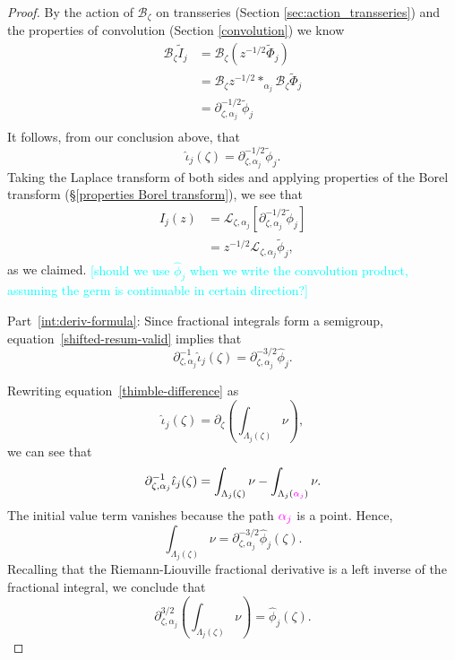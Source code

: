 \documentclass{article}
\theoremstyle{definition}
\newcommand{\C}{\mathbb{C}}
\newcommand{\fracderiv}[3]{\partial^{#1}_{#2, #3}}
\newcommand{\laplace}{\mathcal{L}}
\newcommand{\borel}{\mathcal{B}}
\begin{document}
\begin{proof}
By the action of $\borel_\zeta$ on transseries (Section \ref{sec:action_transseries}) and the properties of convolution (Section \ref{convolution}) we know 
\begin{align*}
\borel_{\zeta} \tilde{I}_j & = \borel_{\zeta}( z^{-1/2} \tilde{\Phi}_j) \\
&=\borel_\zeta z^{-1/2}\ast_{\alpha_j}\borel_\zeta\tilde{\Phi}_j\\
& = \fracderiv{-1/2}{\zeta}{\alpha_j}  \tilde{\phi}_j \\
\end{align*}
It follows, from our conclusion above, that
\begin{equation}\label{shifted-resum-valid}
\hat{\iota}_j(\zeta) = \fracderiv{-1/2}{\zeta}{\alpha_j} \tilde{\phi}_j.
\end{equation}
Taking the Laplace transform of both sides and applying properties of the Borel transform (\S \ref{properties Borel transform}), we see that
\begin{align*}
I_j(z) & = \laplace_{\zeta, \alpha_j} \left[ \partial^{-1/2}_{\zeta, \alpha_j}  \tilde{\phi}_j \right] \\
& = z^{-1/2} \laplace_{\zeta, \alpha_j} \tilde{\phi}_j,
\end{align*}
as we claimed. \textcolor{cyan}{[should we use $\hat{\phi}_j$ when we write the convolution product, assuming the germ is continuable in certain direction?]}

Part~\eqref{int:deriv-formula}: Since fractional integrals form a semigroup, equation~\eqref{shifted-resum-valid} implies that
\[ \fracderiv{-1}{\zeta}{\alpha_j} \hat{\iota}_j(\zeta) = \fracderiv{-3/2}{\zeta}{\alpha_j} \hat{\phi}_j. \]

Rewriting equation~\eqref{thimble-difference} as
\[ \hat{\iota}_j(\zeta) = \partial_\zeta \left( \int_{\Lambda_j(\zeta)} \nu \right), \]
we can see that
\[ \fracderiv{-1}{\zeta}{\alpha_j} \hat{\iota}_j(\zeta) = \int_{\Lambda_j(\zeta)} \nu - \int_{\Lambda_j(\textcolor{Magenta}{\alpha_j})} \nu. \]
The initial value term vanishes because the path $\textcolor{Magenta}{\alpha_j}$ is a point. Hence,
\[ \int_{\Lambda_j(\zeta)} \nu = \fracderiv{-3/2}{\zeta}{\alpha_j} \hat{\phi}_j(\zeta). \]
Recalling that the Riemann-Liouville fractional derivative is a left inverse of the fractional integral, we conclude that
\[ \fracderiv{3/2}{\zeta}{\alpha_j} \left( \int_{\Lambda_j(\zeta)} \nu \right) = \hat{\phi}_j(\zeta). \]
\end{proof}
\end{document}
